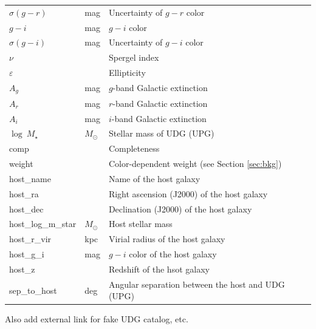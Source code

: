 \documentclass[twocolumn,astrosymb,twocolappendix]{aastex631}
\begin{document}
\begin{CJK*}{UTF8}{gbsn}
\begin{table}
\begin{center}
\begin{tabular}{l l l}
$\sigma(g-r)$            & mag     & Uncertainty of $g-r$ color      \\
$g-i$                    & mag     & $g-i$ color                     \\
$\sigma(g-i)$            & mag     & Uncertainty of $g-i$ color      \\
$\nu$                    &         & Spergel index              \\
$\varepsilon$            &         & Ellipticity                     \\
$A_g$                    & mag     & $g$-band Galactic extinction \\
$A_r$                    & mag     & $r$-band Galactic extinction \\
$A_i$                    & mag     & $i$-band Galactic extinction \\
$\log\ M_\star$ & $M_\odot$ & Stellar mass of UDG (UPG) \\
comp & & Completeness \\
weight & & Color-dependent weight (see Section \ref{sec:bkg}) \\
host\_name & & Name of the host galaxy \\
host\_ra & & Right ascension (J2000) of the host galaxy \\
host\_dec & & Declination (J2000) of the host galaxy \\
host\_log\_m\_star & $M_\odot$ & Host stellar mass\\
host\_r\_vir & kpc & Virial radius of the host galaxy \\
host\_g\_i & mag & $g-i$ color of the host galaxy \\
host\_z &  & Redshift of the hsot galaxy \\
sep\_to\_host & deg & Angular separation between the host and UDG (UPG)\\
\hline\hline
\end{tabular}
\end{center}
\end{table}

Also add external link for fake UDG catalog, etc. 


\end{CJK*}
\end{document}
